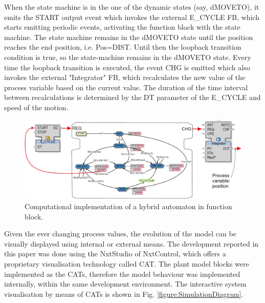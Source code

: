 \documentclass[conference]{IEEEtran}
\begin{document}
When the state machine is in the one of the dynamic states (say, {dMOVETO}), it emits the START output event which invokes the external {E\_CYCLE} FB, which starts emitting periodic events, activating the function block with the state machine. 
The state machine remains in the {dMOVETO} state until the position reaches the end position, i.e. Pos=DIST. Until then the loopback transition condition is true, so the state-machine remains in the {dMOVETO} state. Every time the loopback transition is executed, the event CHG is emitted which also invokes the external "Integrator" FB, which recalculates the new value of the process variable based on the current value. The duration of the time interval between recalculations is determined by the {DT} parameter of the {E\_CYCLE} and speed of the motion. 

\begin{figure}
    \centering
    \includegraphics[scale = 0.36]{images/hybrid.pdf}
    \caption{Computational implementation of a hybrid automaton in function block.}
    \label{figure:Hybrid}
\end{figure}

Given the ever changing process values, the evolution of the model can be visually displayed using internal or external means. The development reported in this paper was done using the NxtStudio of NxtControl, which offers a proprietary visualisation technology called {CAT}. The plant model blocks were implemented as the {CATs}, therefore the model behaviour was implemented internally, within the same development environment. The interactive system visualisation by means of CATs is shown in Fig. \ref{figure:SimulationDiagram}.
\end{document}
